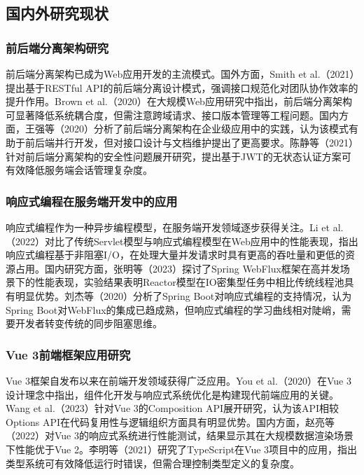 \documentclass[UTF8,AutoFakeBold=1,AutoFakeSlant,zihao=-4]{SCAU}
\begin{document}
\subsection{国内外研究现状}

\subsubsection{前后端分离架构研究}

前后端分离架构已成为Web应用开发的主流模式。国外方面，Smith et al.（2021）提出基于RESTful API的前后端分离设计模式，强调接口规范化对团队协作效率的提升作用。Brown et al.（2020）在大规模Web应用研究中指出，前后端分离架构可显著降低系统耦合度，但需注意跨域请求、接口版本管理等工程问题。国内方面，王强等（2020）分析了前后端分离架构在企业级应用中的实践，认为该模式有助于前后端并行开发，但对接口设计与文档维护提出了更高要求。陈静等（2021）针对前后端分离架构的安全性问题展开研究，提出基于JWT的无状态认证方案可有效降低服务端会话管理复杂度。

\subsubsection{响应式编程在服务端开发中的应用}

响应式编程作为一种异步编程模型，在服务端开发领域逐步获得关注。Li et al.（2022）对比了传统Servlet模型与响应式编程模型在Web应用中的性能表现，指出响应式编程基于非阻塞I/O，在处理大量并发请求时具有更高的吞吐量和更低的资源占用。国内研究方面，张明等（2023）探讨了Spring WebFlux框架在高并发场景下的性能表现，实验结果表明Reactor模型在IO密集型任务中相比传统线程池具有明显优势。刘杰等（2020）分析了Spring Boot对响应式编程的支持情况，认为Spring Boot对WebFlux的集成已趋成熟，但响应式编程的学习曲线相对陡峭，需要开发者转变传统的同步阻塞思维。

\subsubsection{Vue 3前端框架应用研究}

Vue 3框架自发布以来在前端开发领域获得广泛应用。You et al.（2020）在Vue 3设计理念中指出，组件化开发与响应式系统优化是构建现代前端应用的关键。Wang et al.（2023）针对Vue 3的Composition API展开研究，认为该API相较Options API在代码复用性与逻辑组织方面具有明显优势。国内方面，赵亮等（2022）对Vue 3的响应式系统进行性能测试，结果显示其在大规模数据渲染场景下性能优于Vue 2。李明等（2021）研究了TypeScript在Vue 3项目中的应用，指出类型系统可有效降低运行时错误，但需合理控制类型定义的复杂度。
\end{document}
